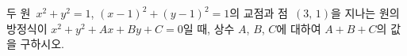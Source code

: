 두 원~$x^2+y^2=1$, $(x-1)^2+(y-1)^2=1$의 교점과 점~$(3,\,1)$을 지나는 원의 방정식이 $x^2+y^2+Ax+By+C=0$일 때, 상수 $A$, $B$, $C$에 대하여 $A+B+C$의 값을 구하시오.
